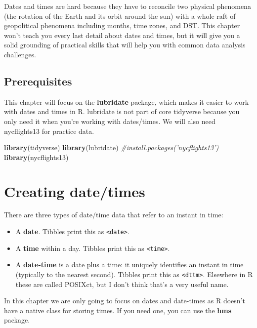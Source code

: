 \documentclass[]{book}
\newenvironment{Shaded}{\begin{snugshade}}{\end{snugshade}}
\newcommand{\KeywordTok}[1]{\textcolor[rgb]{0.13,0.29,0.53}{\textbf{#1}}}
\newcommand{\CommentTok}[1]{\textcolor[rgb]{0.56,0.35,0.01}{\textit{#1}}}
\newcommand{\NormalTok}[1]{#1}
\begin{document}
Dates and times are hard because they have to reconcile two physical
phenomena (the rotation of the Earth and its orbit around the sun) with
a whole raft of geopolitical phenomena including months, time zones, and
DST. This chapter won't teach you every last detail about dates and
times, but it will give you a solid grounding of practical skills that
will help you with common data analysis challenges.

\subsection{Prerequisites}\label{prerequisites}

This chapter will focus on the \textbf{lubridate} package, which makes
it easier to work with dates and times in R. lubridate is not part of
core tidyverse because you only need it when you're working with
dates/times. We will also need nycflights13 for practice data.

\begin{Shaded}
\begin{Highlighting}[]
\KeywordTok{library}\NormalTok{(tidyverse)}
\KeywordTok{library}\NormalTok{(lubridate)}
\CommentTok{#install.packages('nycflights13')}
\KeywordTok{library}\NormalTok{(nycflights13)}
\end{Highlighting}
\end{Shaded}

\section{Creating date/times}\label{creating-datetimes}

There are three types of date/time data that refer to an instant in
time:

\begin{itemize}
\item
  A \textbf{date}. Tibbles print this as
  \texttt{\textless{}date\textgreater{}}.
\item
  A \textbf{time} within a day. Tibbles print this as
  \texttt{\textless{}time\textgreater{}}.
\item
  A \textbf{date-time} is a date plus a time: it uniquely identifies an
  instant in time (typically to the nearest second). Tibbles print this
  as \texttt{\textless{}dttm\textgreater{}}. Elsewhere in R these are
  called POSIXct, but I don't think that's a very useful name.
\end{itemize}

In this chapter we are only going to focus on dates and date-times as R
doesn't have a native class for storing times. If you need one, you can
use the \textbf{hms} package.
\end{document}
